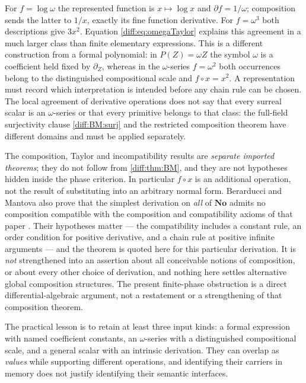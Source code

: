 \documentclass[11pt,letterpaper]{article}
\numberwithin{equation}{section}
\theoremstyle{definition}
\theoremstyle{remark}
\newcommand{\No}{\mathbf{No}}
\newcommand{\der}{\partial}
\newcommand{\derZ}{\der_{Z}}
\begin{document}
\begin{remark}
\label{diff:rem:agreement}
For $f=\log\omega$ the represented function is $x\mapsto\log x$ and
$\der f=1/\omega$; composition sends the latter to $1/x$, exactly its fine
function derivative. For $f=\omega^{3}$ both descriptions give $3x^{2}$.
Equation \cref{diff:eq:omegaTaylor} explains this agreement in a much larger
class than finite elementary expressions. This is a different construction
from a formal polynomial: in $P(Z)=\omega Z$ the symbol $\omega$ is a
coefficient held fixed by $\derZ$, whereas in the $\omega$-series
$f=\omega^{2}$ both occurrences belong to the distinguished compositional
scale and $f\circ x=x^{2}$. A representation must record which interpretation
is intended before any chain rule can be chosen. The local agreement of
derivative operations does not say that every surreal scalar is an
$\omega$-series or that every primitive belongs to that class: the full-field
surjectivity clause \ref{diff:BM:surj} and the restricted composition theorem
have different domains and must be applied separately.
\end{remark}

\begin{warning}
\label{diff:warn:composition}
The composition, Taylor and incompatibility results are \emph{separate
imported theorems}; they do not follow from \cref{diff:thm:BM}, and they are
not hypotheses hidden inside the phase criterion. In particular
$f\circ x$ is an additional operation, not the result of substituting into an
arbitrary normal form. Berarducci and Mantova also prove that the simplest
derivation on \emph{all} of $\No$ admits no composition compatible with the
composition and compatibility axioms of that paper
\cite[Thm 8.4]{BMGerms}. Their hypotheses matter --- the compatibility includes
a constant rule, an order condition for positive derivative, and a chain rule
at positive infinite arguments --- and the theorem is quoted here for this
particular derivation. It is \emph{not} strengthened into an assertion about
all conceivable notions of composition, or about every other choice of
derivation, and nothing here settles alternative global composition
structures. The present finite-phase obstruction is a direct
differential-algebraic argument, not a restatement or a strengthening of that
composition theorem.

The practical lesson is to retain at least three input kinds: a formal
expression with named coefficient constants, an $\omega$-series with a
distinguished compositional scale, and a general scalar with an intrinsic
derivation. They can overlap as \emph{values} while supporting different
operations, and identifying their carriers in memory does not justify
identifying their semantic interfaces.
\end{warning}
\end{document}
